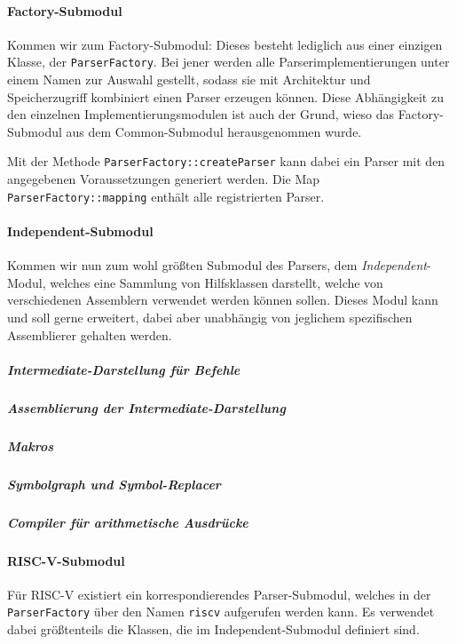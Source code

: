 \paragraph{Factory-Submodul}

Kommen wir zum Factory-Submodul: Dieses besteht lediglich aus einer einzigen Klasse, der \texttt{ParserFactory}. Bei jener werden alle Parserimplementierungen unter einem Namen zur Auswahl gestellt, sodass sie mit Architektur und Speicherzugriff kombiniert einen Parser erzeugen können. Diese Abhängigkeit zu den einzelnen Implementierungsmodulen ist auch der Grund, wieso das Factory-Submodul aus dem Common-Submodul herausgenommen wurde.

Mit der Methode \texttt{ParserFactory::createParser} kann dabei ein Parser mit den angegebenen Voraussetzungen generiert werden. Die Map \texttt{ParserFactory::mapping} enthält alle registrierten Parser.

\paragraph{Independent-Submodul}

Kommen wir nun zum wohl größten Submodul des Parsers, dem \emph{Independent}-Modul, welches eine Sammlung von Hilfsklassen darstellt, welche von verschiedenen Assemblern verwendet werden können sollen. Dieses Modul kann und soll gerne erweitert, dabei aber unabhängig von jeglichem spezifischen Assemblierer gehalten werden.

\subparagraph{Intermediate-Darstellung für Befehle}

\subparagraph{Assemblierung der Intermediate-Darstellung}

\subparagraph{Makros}

\subparagraph{Symbolgraph und Symbol-Replacer}

\subparagraph{Compiler für arithmetische Ausdrücke}

\paragraph{RISC-V-Submodul}

Für RISC-V existiert ein korrespondierendes Parser-Submodul, welches in der \texttt{ParserFactory} über den Namen \texttt{riscv} aufgerufen werden kann. Es verwendet dabei größtenteils die Klassen, die im Independent-Submodul definiert sind.

